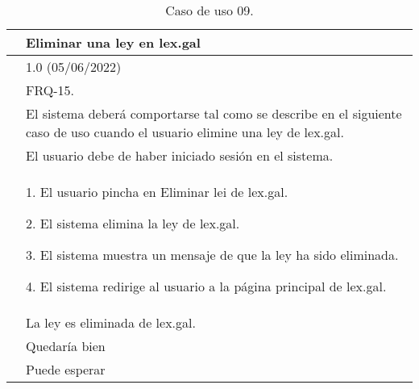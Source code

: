 \begin{table}[H]
\begin{center}
\begin{tabular}{|p{3cm}|p{10cm}|} \hline
\centering {\bf UC-09} & Eliminar una ley en lex.gal  \\ \hline\hline
\centering {\bf Versión} & 1.0 (05/06/2022) \\ \hline
\centering {\bf Dependencias} &  FRQ-15. \\ \hline
\centering {\bf Descripción} &  El sistema deberá comportarse tal como se describe en el siguiente caso de uso cuando el usuario elimine una ley de lex.gal. \\ \hline
\centering {\bf Precondición} &  El usuario debe de haber iniciado sesión en el sistema. \\ \hline
\centering {\bf Secuencia normal} &  
1. El usuario pincha en Eliminar lei de lex.gal.

2. El sistema elimina la ley de lex.gal.

3. El sistema muestra un mensaje de que la ley ha sido eliminada.

4. El sistema redirige al usuario a la página principal de lex.gal.
\\ \hline
\centering {\bf Postcondición} &  La ley es eliminada de lex.gal. \\ \hline
\centering {\bf Importancia} & Quedaría bien \\ \hline
\centering {\bf Urgencia} & Puede esperar \\ \hline
\end{tabular}
\caption{Caso de uso 09.}
\label{enlaceUC9}
\end{center}
\end{table}